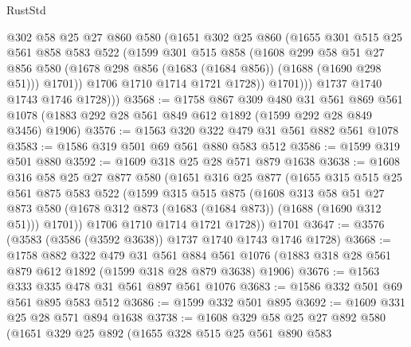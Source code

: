 \begin{lexlean}{RustStd}
\begin{coremodule}
                @302
                @58
                @25
                @27
                @860
                @580
                (@1651
                  @302
                  @25
                  @860
                  (@1655
                    @301
                    @515
                    @25
                    @561
                    @858
                    @583
                    @522
                    (@1599
                      @301
                      @515
                      @858
                      (@1608
                        @299
                        @58
                        @51
                        @27
                        @856
                        @580
                        (@1678 @298 @856 (@1683 (@1684 @856)) (@1688 (@1690 @298 @51)))
                        @1701))
                    @1706
                    @1710
                    @1714
                    @1721
                    @1728))
                @1701)))
          @1737
          @1740
          @1743
          @1746
          @1728)))
@3568 := @1758
    @867
    @309
    @480
    @31
    @561
    @869
    @561
    @1078
    (@1883 @292 @28 @561 @849 @612 @1892 (@1599 @292 @28 @849 @3456) @1906)
@3576 := @1563 @320 @322 @479 @31 @561 @882 @561 @1078
@3583 := @1586 @319 @501 @69 @561 @880 @583 @512
@3586 := @1599 @319 @501 @880
@3592 := @1609 @318 @25 @28 @571 @879 @1638
@3638 := @1608
    @316
    @58
    @25
    @27
    @877
    @580
    (@1651
      @316
      @25
      @877
      (@1655
        @315
        @515
        @25
        @561
        @875
        @583
        @522
        (@1599
          @315
          @515
          @875
          (@1608
            @313
            @58
            @51
            @27
            @873
            @580
            (@1678 @312 @873 (@1683 (@1684 @873)) (@1688 (@1690 @312 @51)))
            @1701))
        @1706
        @1710
        @1714
        @1721
        @1728))
    @1701
@3647 := @3576 (@3583 (@3586 (@3592 @3638)) @1737 @1740 @1743 @1746 @1728)
@3668 := @1758
    @882
    @322
    @479
    @31
    @561
    @884
    @561
    @1076
    (@1883 @318 @28 @561 @879 @612 @1892 (@1599 @318 @28 @879 @3638) @1906)
@3676 := @1563 @333 @335 @478 @31 @561 @897 @561 @1076
@3683 := @1586 @332 @501 @69 @561 @895 @583 @512
@3686 := @1599 @332 @501 @895
@3692 := @1609 @331 @25 @28 @571 @894 @1638
@3738 := @1608
    @329
    @58
    @25
    @27
    @892
    @580
    (@1651
      @329
      @25
      @892
      (@1655
        @328
        @515
        @25
        @561
        @890
        @583

\end{coremodule}
\end{lexlean}
